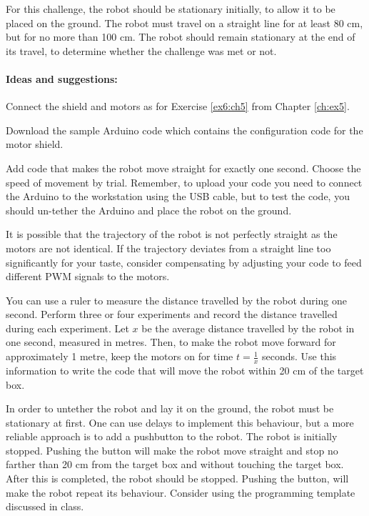 \documentclass[12pt]{book}
\begin{document}
For this challenge, the robot should be stationary initially, to allow it to be placed on the ground. The robot must travel on
a straight line for at least 80 cm, but for no more than 100 cm. The
robot should remain stationary at the end of its travel, to determine
whether the challenge was met or not.


\paragraph{Ideas and suggestions:}

\begin{compactenum}[1)]
\item Connect the shield and motors as for Exercise \ref*{ex6:ch5}
  from Chapter
  \ref*{ch:ex5}. 
\item Download the sample Arduino code which contains the
  configuration code for the motor shield. 
\item Add code that makes the robot move straight for exactly one
  second. Choose the speed of movement by trial. Remember, to upload
  your code you need to connect the Arduino to the workstation using
  the USB cable, but to test the code, you should un-tether the
  Arduino and place the robot on the ground.

\item  It is possible that
  the trajectory of the robot is not perfectly straight as the motors
  are not identical. If the trajectory deviates from a straight line
  too significantly for your taste, consider compensating by adjusting
  your code to feed different PWM signals to the motors. 

\item You can use a ruler to measure the distance travelled by the robot
  during one second. Perform three or four experiments and record the
  distance travelled during each experiment. Let $x$ be the average
  distance travelled by the robot in one second, measured in
  metres. Then, to make the robot move forward for approximately 1 metre,
  keep the motors on for time $t=\frac{1}{x}$ seconds. Use this information to
  write the code that will move the robot within 20 cm of the target box.

\item In order to untether the robot and lay it on the ground, the robot must be stationary at first. One can use
  delays to implement this behaviour, but a more reliable approach is
  to add a pushbutton to the robot. The robot is initially
  stopped. Pushing the button will make the robot move straight 
  and stop no farther than 20 cm
from the target box and without touching the target box.
  After this is completed, the robot should be
  stopped. Pushing the button, will make the robot repeat its
  behaviour. Consider using the programming template discussed in class.
\end{compactenum}
\end{document}
